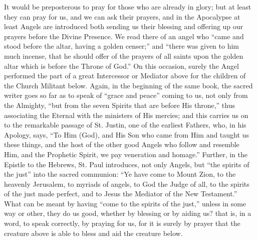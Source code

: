 It would be preposterous to pray for those who are already in glory;
but at least they can pray for us, and we can ask their prayers, and in
the Apocalypse at least Angels are introduced both sending us their
blessing and offering up our prayers before the Divine Presence. We read
there of an angel who ``came and stood before the altar, having a
golden censer;'' and ``there was given to him much incense, that
he should offer of the prayers of all saints upon the golden altar which
is before the Throne of God.'' On this occasion, surely the Angel
performed the part of a great Intercessor or Mediator above for the
children of the Church Militant below. Again, in the beginning of the
same book, the sacred writer goes so far as to speak of ``grace and
peace'' coming to us, not only from the Almighty, ``but from the
seven Spirits that are before His throne,'' thus associating the
Eternal with the ministers of His mercies; and this carries us on to the
remarkable passage of St. Justin, one of the earliest Fathers, who, in
his Apology, says, ``To Him (God), and His Son who came from
Him and taught us these things, and the host of the other good Angels
who follow and resemble Him, and the Prophetic Spirit, we pay veneration
and homage.'' Further, in the Epistle to the Hebrews, St. Paul
introduces, not only Angels, but ``the spirits of the just''
into the sacred communion: ``Ye have come to Mount Zion, to the
heavenly Jerusalem, to myriads of angels, to God the Judge of all, to
the spirits of the just made perfect, and to Jesus the Mediator of the
New Testament.'' What can be meant by having ``come to the
spirits of the just,'' unless in some way or other, they do us good,
whether by blessing or by aiding us? that is, in a word, to speak
correctly, by praying for us, for it is surely by prayer that the
creature above is able to bless and aid the creature below.

